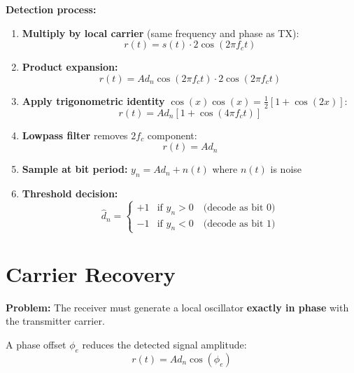 \textbf{Detection process:}

\begin{enumerate}
\item \textbf{Multiply by local carrier} (same frequency and phase as TX):
\begin{equation}
r(t) = s(t) \cdot 2\cos(2\pi f_c t)
\end{equation}

\item \textbf{Product expansion:}
\begin{equation}
r(t) = A d_n \cos(2\pi f_c t) \cdot 2\cos(2\pi f_c t)
\end{equation}

\item \textbf{Apply trigonometric identity} $\cos(x)\cos(x) = \frac{1}{2}[1 + \cos(2x)]$:
\begin{equation}
r(t) = A d_n [1 + \cos(4\pi f_c t)]
\end{equation}

\item \textbf{Lowpass filter} removes $2f_c$ component:
\begin{equation}
r(t) = A d_n
\end{equation}

\item \textbf{Sample at bit period:} $y_n = A d_n + n(t)$ where $n(t)$ is noise

\item \textbf{Threshold decision:}
\begin{equation}
\hat{d}_n = \begin{cases}
+1 & \text{if } y_n > 0 \quad \text{(decode as bit 0)} \\
-1 & \text{if } y_n < 0 \quad \text{(decode as bit 1)}
\end{cases}
\end{equation}
\end{enumerate}

\section{Carrier Recovery}

\textbf{Problem:} The receiver must generate a local oscillator \textbf{exactly in phase} with the transmitter carrier.

A phase offset $\phi_e$ reduces the detected signal amplitude:
\begin{equation}
r(t) = A d_n \cos(\phi_e)
\end{equation}

